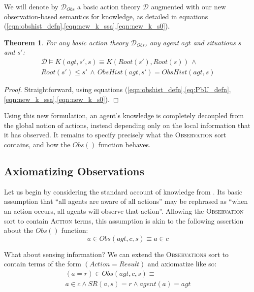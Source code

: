 \documentclass{ifaamas-submission}
\newcommand{\noun}[1]{\textsc{#1}}
\newtheorem{theorem}{Theorem}
\begin{document}
\begin{definition}
We will denote by $\mathcal{D}_{Obs}$ a basic action theory $\mathcal{D}$
augmented with our new observation-based semantics for knowledge,
as detailed in equations (\ref{eqn:obshist_defn},\ref{eqn:new_k_ssa},\ref{eqn:new_k_s0}).
\end{definition}
\begin{theorem}
\label{thm:k_obs_equiv} For any basic action theory $\mathcal{D}_{Obs}$,
any agent $agt$ and situations $s$ and $s'$:\begin{multline*}
\mathcal{D}\models K(agt,s',s)\equiv K(Root(s'),Root(s))\,\wedge\\
Root(s')\leq s'\,\wedge\, ObsHist(agt,s')=ObsHist(agt,s)\end{multline*}

\end{theorem}
\begin{proof}
Straightforward, using equations (\ref{eqn:obshist_defn},\ref{eq:PbU_defn},\ref{eqn:new_k_ssa},\ref{eqn:new_k_s0}). 
\end{proof}%
Using this new formulation, an agent's knowledge is completely decoupled
from the global notion of actions, instead depending only on the local
information that it has observed. It remains to specify precisely
what the \noun{Observation} sort contains, and how the $Obs()$
function behaves.


\subsection{Axiomatizing Observations}

Let us begin by considering the standard account of knowledge from
\cite{scherl03sc_knowledge}. Its basic assumption that {}``all agents
are aware of all actions'' may be rephrased as {}``when an action
occurs, all agents will observe that action''. Allowing the \noun{Observation}
sort to contain \noun{Action} terms, this assumption is akin to the
following assertion about the $Obs()$ function:\begin{equation}
a\in Obs(agt,c,s)\equiv a\in c\label{eq:ax_obs_std1}\end{equation}


What about sensing information? We can extend the \noun{Observations}
sort to contain terms of the form \emph{$(Action=Result)$} and axiomatize
like so:\begin{multline}
(a=r)\in Obs(agt,c,s)\equiv\\
a\in c\wedge SR(a,s)=r\wedge agent(a)=agt\label{eq:ax_obs_std2}\end{multline}
\end{document}
